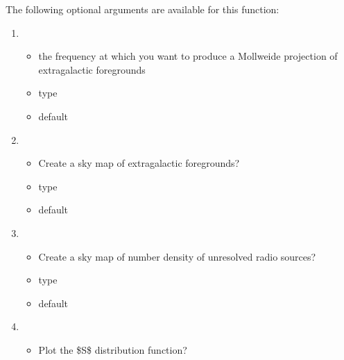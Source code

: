 \documentclass[letterpaper,10pt,english]{sphinxmanual}
\begin{document}
\sphinxAtStartPar
The following optional arguments are available for this function:\sphinxhyphen{}
\begin{enumerate}
%
\item {} 
\sphinxAtStartPar
{}
\begin{itemize}
\item {} 
\sphinxAtStartPar
the frequency at which you want to produce a Mollweide projection
of extragalactic foregrounds

\item {} 
\sphinxAtStartPar
type 

\item {} 
\sphinxAtStartPar
default 

\end{itemize}

\item {} 
\sphinxAtStartPar
{}
\begin{itemize}
\item {} 
\sphinxAtStartPar
Create a sky map of extragalactic foregrounds?

\item {} 
\sphinxAtStartPar
type 

\item {} 
\sphinxAtStartPar
default 

\end{itemize}

\item {} 
\sphinxAtStartPar
{}
\begin{itemize}
\item {} 
\sphinxAtStartPar
Create a sky map of number density of unresolved radio sources?

\item {} 
\sphinxAtStartPar
type 

\item {} 
\sphinxAtStartPar
default 

\end{itemize}

\item {} 
\sphinxAtStartPar
{}
\begin{itemize}
\item {} 
\sphinxAtStartPar
Plot the \$S\$ distribution function?


\end{itemize}
\end{enumerate}
\end{document}

